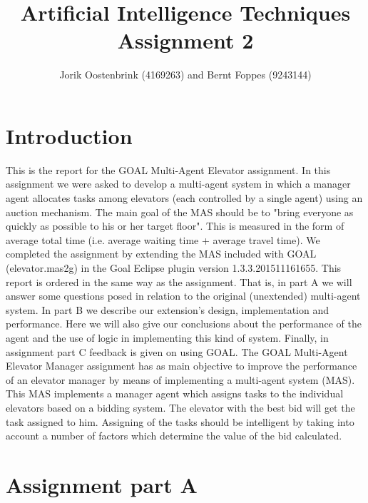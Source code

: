 \documentclass[a4paper,11pt]{article}
\title{Artificial Intelligence Techniques Assignment 2}
\author{Jorik Oostenbrink (4169263) and Bernt Foppes (9243144)}
\date{}
\begin{document}
\maketitle	

\section{Introduction}
This is the report for the GOAL Multi-Agent Elevator assignment. In this assignment we were asked to develop a multi-agent system in which a manager agent allocates tasks among elevators (each controlled by a single agent) using an auction mechanism.
\newline\newline
The main goal of the MAS should be to "bring everyone as quickly as possible to his or her target floor". This is measured in the form of average total time (i.e. average waiting time + average travel time).
\newline\newline
We completed the assignment by extending the MAS included with GOAL (elevator.mas2g) in the Goal Eclipse plugin version 1.3.3.201511161655.
\newline\newline
This report is ordered in the same way as the assignment. That is, in part A we will answer some questions posed in relation to the original (unextended) multi-agent system. In part B we describe our extension's design, implementation and performance. Here we will also give our conclusions about the performance of the agent and the use of logic in implementing this kind of system. Finally, in assignment part C feedback is given on using GOAL.
\newline\newline
The GOAL Multi-Agent Elevator Manager assignment has as main objective to improve the performance of an elevator manager by means of implementing a multi-agent system (MAS). This MAS implements a manager agent which assigns tasks to the individual elevators based on a bidding system. The elevator with the best bid will get the task assigned to him. Assigning of the tasks should be intelligent by taking into account a number of factors which determine the value of the bid calculated. 

\section{Assignment part A}
\end{document}
